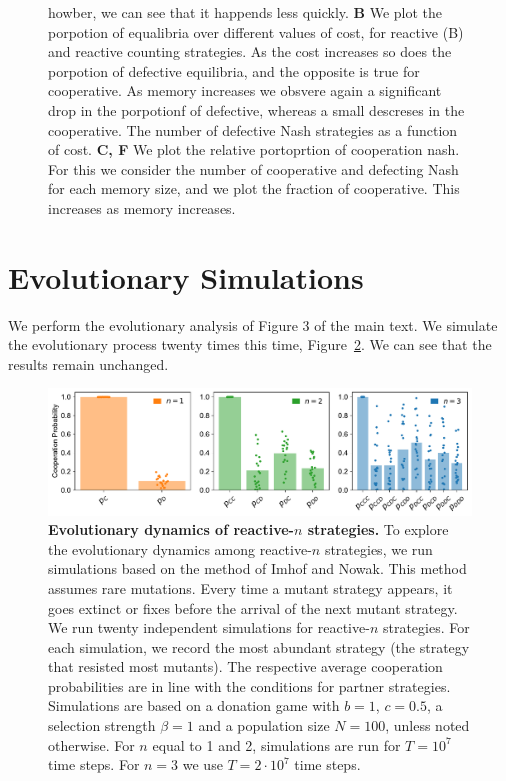 \documentclass[11pt]{article}
\theoremstyle{plainCl1}
\theoremstyle{plainCl2}
\begin{document}
\begin{figure}[t]
{howber, we can see that it happends less quickly.
{\bf B} We plot the porpotion of equalibria
over different values of cost, for reactive (B) and reactive counting strategies.
As the cost increases so does the porpotion of defective equilibria, and the opposite
is true for cooperative. As memory increases we obsvere again a significant drop
in the porpotionf of defective, whereas a small descreses in the cooperative.
The number of defective Nash strategies as a function of cost.
{\bf C, F} We plot the relative portoprtion of cooperation nash. 
For this we consider the number of cooperative and defecting Nash for each 
memory size, and we plot the fraction of cooperative.  This increases as memory
increases.
}\label{fig:reactive_volume}
\end{figure}


\section{Evolutionary Simulations}

We perform the evolutionary analysis of Figure 3 of the main text. We simulate
the evolutionary process twenty times this time,
Figure~\ref{fig:evolutionary_results}. We can see that the results remain unchanged.

\begin{figure}[tbhp]
    \centering
    \includegraphics[width=\textwidth]{../../figures/siFig3AbundantStrategies.pdf}
    \caption{\textbf{Evolutionary dynamics of reactive-$n$ strategies.}
    To explore the evolutionary dynamics among reactive-$n$ strategies, we run simulations based on the
    method of Imhof and Nowak. 
    This method assumes rare mutations. 
    Every time a mutant strategy appears, it goes extinct or fixes before the arrival of the next mutant strategy. 
    We run twenty independent simulations for reactive-$n$ strategies.
    For each simulation, we record the most abundant strategy (the strategy that resisted most mutants). 
    The respective average cooperation probabilities are in line with the conditions for partner strategies. 
    Simulations are based on a donation game with \(b\!=\!1\),  \(c\!=\!0.5\), a selection strength $\beta\!=\!1$
    and a population size $N\!=\!100$, unless noted otherwise. For $n$ equal to 1 and 2, simulations are run for \(T\!=\! 10 ^ 7\) time steps. For $n\!=\!3$ we use \(T\!=\! 2 \!\cdot\!10 ^ 7\) time steps.
    }\label{fig:evolutionary_results}
\end{figure}
\end{document}
